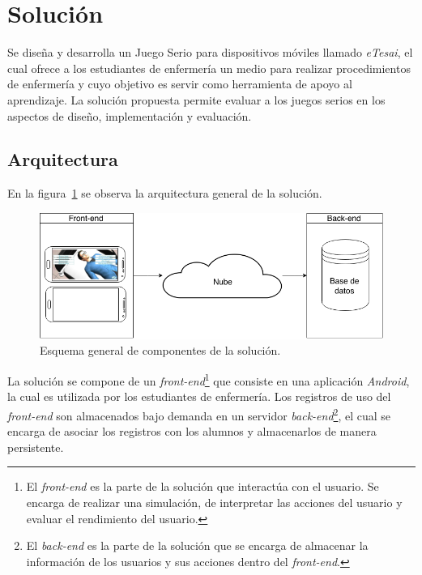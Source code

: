 
\section{Solución}


Se diseña y desarrolla un Juego Serio para dispositivos móviles llamado
\textit{eTesai}, el cual ofrece a los estudiantes de enfermería un medio para
realizar procedimientos de enfermería y cuyo objetivo es servir como herramienta
de apoyo al aprendizaje. La solución propuesta permite evaluar a los juegos
serios en los aspectos de diseño, implementación y evaluación.


\subsection{Arquitectura}

En la figura~\ref{fig:full_architecture} se observa la arquitectura general de la 
solución.

\begin{figure}[H]
\centering
\includegraphics[scale=0.29]{images/full.png}
\caption{Esquema general de componentes de la solución.}
\label{fig:full_architecture}
\end{figure}

La solución se compone de un \textit{front-end}\footnote{El \textit{front-end}
    es la parte de la solución que interactúa con el usuario. Se encarga de
    realizar una simulación, de interpretar las acciones del usuario y evaluar
    el rendimiento del usuario.} que consiste en una aplicación \textit{Android}, la cual
es utilizada por los estudiantes de enfermería. Los registros de uso del
\textit{front-end} son almacenados bajo demanda en un servidor
\textit{back-end}\footnote{El \textit{back-end} es la parte de la solución que
    se encarga de almacenar la información de los usuarios y sus acciones dentro
    del \textit{front-end}.}, el cual se encarga de asociar los registros con
los alumnos y almacenarlos de manera persistente.

